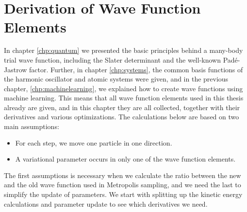 \chapter{Derivation of Wave Function Elements} \label{chp:WFE}
In chapter \eqref{chp:quantum} we presented the basic principles behind a many-body trial wave function, including the Slater determinant and the well-known Padé-Jastrow factor. Further, in chapter \eqref{chp:systems}, the common basis functions of the harmonic oscillator and atomic systems were given, and in the previous chapter, \eqref{chp:machinelearning}, we explained how to create wave functions using machine learning. This means that all wave function elements used in this thesis already are given, and in this chapter they are all collected, together with their derivatives and various optimizations. The calculations below are based on two main assumptions:
\begin{itemize}
	\item For each step, we move one particle in one direction.
	\item A variational parameter occurs in only one of the wave function elements.
\end{itemize}
The first assumptions is necessary when we calculate the ratio between the new and the old wave function used in Metropolis sampling, and we need the last to simplify the update of parameters. We start with splitting up the kinetic energy calculations and parameter update to see which derivatives we need.

